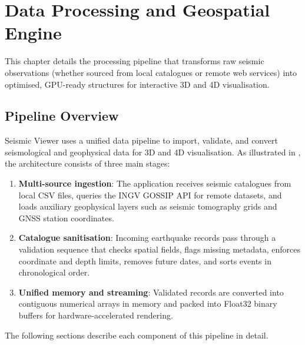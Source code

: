 
\chapter{Data Processing and Geospatial Engine}
\label{ch:data}

This chapter details the processing pipeline that transforms raw seismic observations (whether sourced from local catalogues or remote web services) into optimised, GPU-ready structures for interactive 3D and 4D visualisation.

\section{Pipeline Overview}
\label{sec:pipeline-overview}

Seismic Viewer uses a unified data pipeline to import, validate, and convert seismological and geophysical data for 3D and 4D visualisation. As illustrated in , the architecture consists of three main stages:
\begin{enumerate}
    \item \textbf{Multi-source ingestion}: The application receives seismic catalogues from local CSV files, queries the INGV GOSSIP API for remote datasets, and loads auxiliary geophysical layers such as seismic tomography grids and GNSS station coordinates.
    \item \textbf{Catalogue sanitisation}: Incoming earthquake records pass through a validation sequence that checks spatial fields, flags missing metadata, enforces coordinate and depth limits, removes future dates, and sorts events in chronological order.
    \item \textbf{Unified memory and streaming}: Validated records are converted into contiguous numerical arrays in memory and packed into Float32 binary buffers for hardware-accelerated rendering.
\end{enumerate}
The following sections describe each component of this pipeline in detail.

